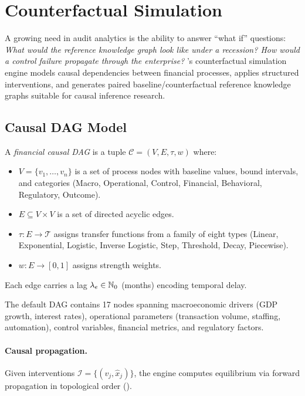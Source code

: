 \section{Counterfactual Simulation}
\label{sec:counterfactual}

A growing need in audit analytics is the ability to answer ``what if''
questions: \emph{What would the reference knowledge graph look like
under a recession?  How would a control failure propagate through the
enterprise?}  \system{}'s counterfactual simulation engine models
causal dependencies between financial processes, applies structured
interventions, and generates paired baseline/counterfactual reference
knowledge graphs suitable for causal inference research.

\subsection{Causal DAG Model}
\label{sec:cf_dag}

\begin{definition}
\label{def:causal_dag}
A \emph{financial causal DAG} is a tuple $\mathcal{C} = (V, E, \tau, w)$ where:
\begin{itemize}
  \item $V = \{v_1, \ldots, v_n\}$ is a set of process nodes with
    baseline values, bound intervals, and categories
    (Macro, Operational, Control, Financial, Behavioral, Regulatory,
    Outcome).
  \item $E \subseteq V \times V$ is a set of directed acyclic edges.
  \item $\tau : E \to \mathcal{T}$ assigns transfer functions from
    a family of eight types (Linear, Exponential, Logistic, Inverse
    Logistic, Step, Threshold, Decay, Piecewise).
  \item $w : E \to [0,1]$ assigns strength weights.
\end{itemize}
Each edge carries a lag $\lambda_e \in \mathbb{N}_0$ (months) encoding temporal
delay.
\end{definition}

The default DAG contains 17 nodes spanning macroeconomic drivers
(GDP growth, interest rates), operational parameters (transaction
volume, staffing, automation), control variables, financial metrics,
and regulatory factors.

\paragraph{Causal propagation.}
Given interventions $\mathcal{I} = \{(v_j, \hat{x}_j)\}$, the engine
computes equilibrium via forward propagation in topological order
().

